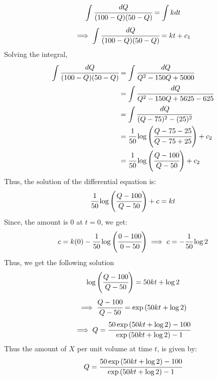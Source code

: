 \documentclass{article}
\begin{document}
$$\displaystyle\int \cfrac{dQ}{(100 - Q)(50 - Q)} = \displaystyle\int kdt $$
$$\implies \displaystyle\int \cfrac{dQ}{(100 - Q)(50 - Q)} = kt + c_1 $$
Solving the integral,
\begin{align*}
    \displaystyle\int \cfrac{dQ}{(100 - Q)(50 - Q)}
    &= \displaystyle\int \cfrac{dQ}{Q^2 - 150Q + 5000} \\
    &= \displaystyle\int \cfrac{dQ}{Q^2 - 150Q + 5625 - 625} \\
    &= \displaystyle\int \cfrac{dQ}{(Q-75)^2 - (25)^2} \\
    &= \cfrac{1}{50}
    \log \left(\cfrac{Q-75-25}{Q-75+25}\right) + c_2
     \\
    &= \cfrac{1}{50}
    \log \left(\cfrac{Q-100}{Q-50}\right) + c_2
     \\
\end{align*}
Thus, the solution of the differential equation is:
$$\cfrac{1}{50} \log \left(\cfrac{Q-100}{Q-50}\right) + c =kt $$
Since, the amount is 0 at $t = 0$, we get:
$$c = k(0) - \cfrac{1}{50} \log \left(\cfrac{0-100}{0-50}\right)\implies c = - \cfrac{1}{50} \log 2$$
Thus, we get the following solution
$$\log \left(\cfrac{Q-100}{Q-50}\right) =50kt + \log 2 $$
$$\implies \cfrac{Q-100}{Q-50} = \exp {\left(50kt + \log 2\right)} $$
$$\implies Q = \cfrac{50\exp {\left(50kt + \log 2\right)}-100}{\exp {\left(50kt + \log 2\right)} - 1} $$
Thus the amount of $X$ per unit volume at time $t$, is given by:
$$Q = \cfrac{50\exp {\left(50kt + \log 2\right)}-100}{\exp {\left(50kt + \log 2\right)} - 1} $$
\end{document}
